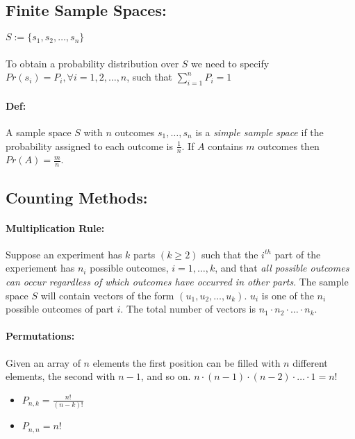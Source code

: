 \documentclass{article}[10pt]
\begin{document}
\begin{multicols}{2}
    \subsection*{Finite Sample Spaces: } 
        \(S := \{s_1, s_2, \dots, s_n \}\)
        
        \paragraph*{} 
            To obtain a probability distribution over $S$ we need to specify \(Pr(s_i) = P_i, \forall i = 1, 2, \dots, n\), such that \(\sum\limits_{i=1}^{n}P_i = 1\)

        \paragraph*{Def: } 
            A sample space $S$ with $n$ outcomes $s_1, \ldots, s_n$ is a \textit{simple sample space} if the probability assigned to each outcome is $\frac{1}{n}$. If $A$ contains $m$ outcomes then \(Pr(A) = \frac{m}{n}\).

    \subsection*{Counting Methods: }
        
        \paragraph*{Multiplication Rule: } 
            Suppose an experiment has $k$ parts \((k \geq 2)\) such that the $i^{th}$ part of the experiement has $n_i$ possible outcomes, $i = 1, \ldots, k$, and that \textit{all possible outcomes can occur regardless of which outcomes have occurred in other parts}. The sample space $S$ will contain vectors of the form $(u_1, u_2, \ldots, u_k)$. $u_i$ is one of the $n_i$ possible outcomes of part $i$. The total number of vectors is $n_1 \cdot n_2 \cdot \ldots \cdot n_k$.
        
        \paragraph*{Permutations: } 
            Given an array of $n$ elements the first position can be filled with $n$ different elements, the second with $n-1$, and so on. $n \cdot (n-1) \cdot (n-2) \cdot \ldots \cdot 1 = n!$

            \begin{itemize}
                \item[] \(P_{n,k} = \frac{n!}{(n-k)!}\)
                \item[] \(P_{n,n} = n!\)
            \end{itemize}


\end{multicols}
\end{document}
